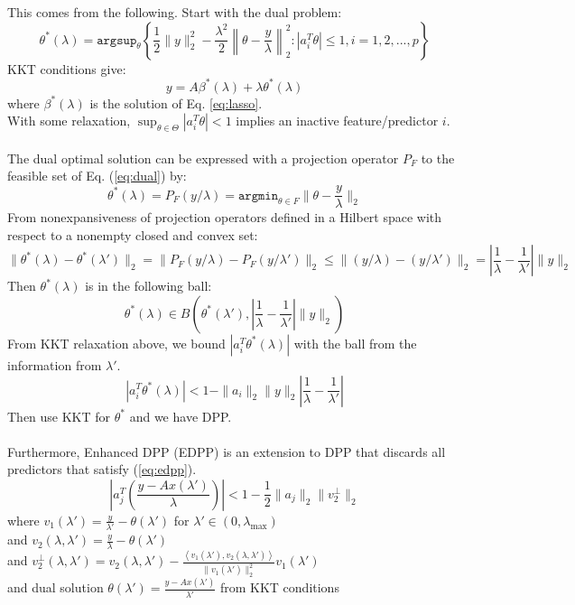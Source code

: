 \documentclass{article}
\begin{document}
This comes from the following.
Start with the dual problem:
\begin{equation} \label{eq:dual}
\theta^*(\lambda)=\texttt{argsup}_\theta \left\{\frac 12 \|y\|_2^2 - \frac {\lambda^2}{2}\left\|\theta-\frac{y}{\lambda}\right\|_2^2 : |a^T_i \theta|\le 1, i = 1,2,...,p \right\}
\end{equation}
KKT conditions give:
$$ y = A\beta^{*}(\lambda) + \lambda\theta^*(\lambda) $$
where $ \beta^{*}(\lambda) $ is the solution of Eq. \ref{eq:lasso}.\\
With some relaxation, $\sup_{\theta\in\Theta}|a_i^T\theta|<1$ implies an inactive feature/predictor $i$.\\
\\
The dual optimal solution can be expressed with a projection operator $P_F$ to the feasible set of Eq. (\ref{eq:dual}) by:
$$ \theta^*(\lambda) = P_F(y/\lambda) = \texttt{argmin}_{\theta\in F}\|\theta - \frac y\lambda\|_2 $$
From nonexpansiveness of projection operators defined in a Hilbert space with respect to a nonempty closed and convex set:
$$ \|\theta^*(\lambda)-\theta^*(\lambda')\|_2 = \|P_F(y/\lambda)-P_F(y/\lambda')\|_2 \le \|(y/\lambda)-(y/\lambda')\|_2 = \left| \frac{1}{\lambda}-\frac{1}{\lambda'} \right| \|y\|_2 $$
Then $\theta^*(\lambda)$ is in the following ball:
$$ \theta^*(\lambda)\in B\left(\theta^*(\lambda'),\left| \frac{1}{\lambda}-\frac{1}{\lambda'} \right| \|y\|_2\right) $$
From KKT relaxation above, we bound $|a_i^T\theta^*(\lambda)|$ with the ball from the information from $\lambda'$.
$$ |a_i^T\theta^*(\lambda)| < 1 - \|a_i\|_2\|y\|_2\left|\frac{1}{\lambda}-\frac{1}{\lambda'}\right| $$
Then use KKT for $\theta^*$ and we have DPP.\\
~\\

Furthermore, Enhanced DPP (EDPP) \cite{ddp} is an extension to DPP that discards all predictors that satisfy (\ref{eq:edpp}).\\

\begin{equation} \label{eq:edpp}
\left|a_j^T \left(\frac{y - Ax(\lambda')}{\lambda}\right)\right| < 1 - \frac 12 \|a_j\|_2 \|v_2^{\perp}\|_2
\end{equation}
where $v_1(\lambda') = \frac{y}{\lambda'} - \theta(\lambda')$ for $\lambda' \in (0, \lambda_{\max})$\\
and $v_2(\lambda,\lambda') = \frac{y}{\lambda} - \theta(\lambda')$\\
and $v_2^{\perp}(\lambda,\lambda') = v_2(\lambda,\lambda') - \frac{\left<v_1(\lambda'),v_2(\lambda,\lambda')\right>}{\|v_1(\lambda')\|^2_2} v_1(\lambda')$\\
and dual solution $\theta(\lambda') = \frac{y-Ax(\lambda')}{\lambda'} $ from KKT conditions \\
\end{document}

